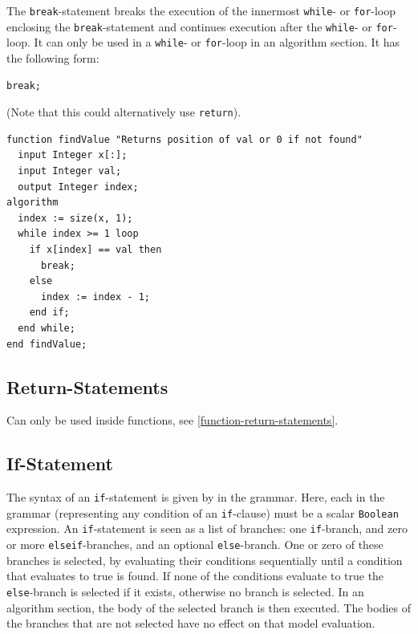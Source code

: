 The \lstinline!break!-statement breaks the execution of the innermost \lstinline!while!- or \lstinline!for!-loop enclosing the \lstinline!break!-statement and continues execution after the \lstinline!while!- or \lstinline!for!-loop.
It can only be used in a \lstinline!while!- or \lstinline!for!-loop in an algorithm section.
It has the following form:
\begin{lstlisting}[language=modelica]
break;
\end{lstlisting}

\begin{example}
(Note that this could alternatively use \lstinline!return!).
\begin{lstlisting}[language=modelica]
function findValue "Returns position of val or 0 if not found"
  input Integer x[:];
  input Integer val;
  output Integer index;
algorithm
  index := size(x, 1);
  while index >= 1 loop
    if x[index] == val then
      break;
    else
      index := index - 1;
    end if;
  end while;
end findValue;
\end{lstlisting}
\end{example}


\subsection{Return-Statements}\label{return-statements}

Can only be used inside functions, see \cref{function-return-statements}.


\subsection{If-Statement}\label{if-statement}

The syntax of an \lstinline!if!-statement is given by  in the grammar.
Here, each  in the grammar (representing any condition of an \lstinline!if!-clause) must be a scalar \lstinline!Boolean! expression.
An \lstinline!if!-statement is seen as a list of branches: one \lstinline!if!-branch, and zero or more \lstinline!elseif!-branches, and an optional \lstinline!else!-branch.
One or zero of these branches is selected, by evaluating their conditions sequentially until a condition that evaluates to true is found.
If none of the conditions evaluate to true the \lstinline!else!-branch is selected if it exists, otherwise no branch is selected.
In an algorithm section, the body of the selected branch is then executed.
The bodies of the branches that are not selected have no effect on that model evaluation.



